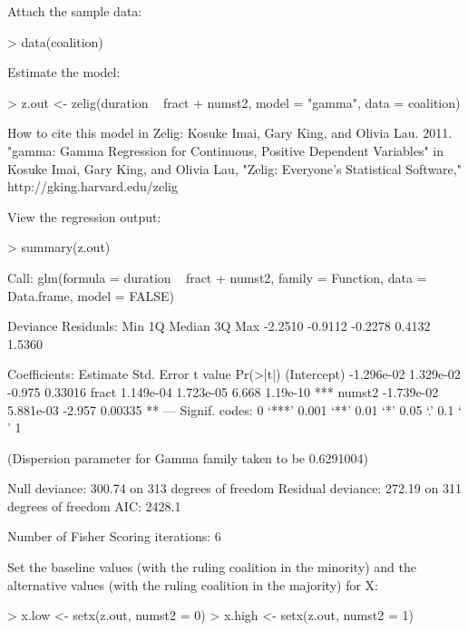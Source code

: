 Attach the sample data: 
\begin{Schunk}
\begin{Sinput}
> data(coalition)
\end{Sinput}
\end{Schunk}
Estimate the model: 
\begin{Schunk}
\begin{Sinput}
> z.out <- zelig(duration ~ fract + numst2, model = "gamma", data = coalition)
\end{Sinput}
\begin{Soutput}
How to cite this model in Zelig:
  Kosuke Imai, Gary King, and Olivia Lau. 2011.
  "gamma: Gamma Regression for Continuous, Positive Dependent Variables"
  in Kosuke Imai, Gary King, and Olivia Lau, "Zelig: Everyone's Statistical Software,"
  http://gking.harvard.edu/zelig
\end{Soutput}
\end{Schunk}
View the regression output:  
\begin{Schunk}
\begin{Sinput}
> summary(z.out)
\end{Sinput}
\begin{Soutput}
Call:
glm(formula = duration ~ fract + numst2, family = Function, data = Data.frame, 
    model = FALSE)

Deviance Residuals: 
    Min       1Q   Median       3Q      Max  
-2.2510  -0.9112  -0.2278   0.4132   1.5360  

Coefficients:
              Estimate Std. Error t value Pr(>|t|)    
(Intercept) -1.296e-02  1.329e-02  -0.975  0.33016    
fract        1.149e-04  1.723e-05   6.668 1.19e-10 ***
numst2      -1.739e-02  5.881e-03  -2.957  0.00335 ** 
---
Signif. codes:  0 ‘***’ 0.001 ‘**’ 0.01 ‘*’ 0.05 ‘.’ 0.1 ‘ ’ 1 

(Dispersion parameter for Gamma family taken to be 0.6291004)

    Null deviance: 300.74  on 313  degrees of freedom
Residual deviance: 272.19  on 311  degrees of freedom
AIC: 2428.1

Number of Fisher Scoring iterations: 6
\end{Soutput}
\end{Schunk}
Set the baseline values (with the ruling coalition in the minority)
and the alternative values (with the ruling coalition in the majority)
for X:
\begin{Schunk}
\begin{Sinput}
> x.low <- setx(z.out, numst2 = 0)
> x.high <- setx(z.out, numst2 = 1)
\end{Sinput}
\end{Schunk}

